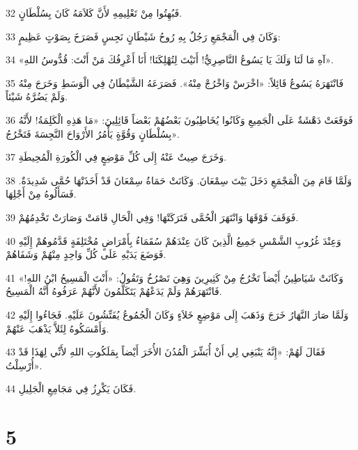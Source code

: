 \par 32 فَبُهِتُوا مِنْ تَعْلِيمِهِ لأَنَّ كَلاَمَهُ كَانَ بِسُلْطَانٍ.
\par 33 وَكَانَ فِي الْمَجْمَعِ رَجُلٌ بِهِ رُوحُ شَيْطَانٍ نَجِسٍ فَصَرَخَ بِصَوْتٍ عَظِيمٍ:
\par 34 «آهِ مَا لَنَا وَلَكَ يَا يَسُوعُ النَّاصِرِيُّ! أَتَيْتَ لِتُهْلِكَنَا! أَنَا أَعْرِفُكَ مَنْ أَنْتَ: قُدُّوسُ اللهِ».
\par 35 فَانْتَهَرَهُ يَسُوعُ قَائِلاً: «اخْرَسْ وَاخْرُجْ مِنْهُ». فَصَرَعَهُ الشَّيْطَانُ فِي الْوَسَطِ وَخَرَجَ مِنْهُ وَلَمْ يَضُرَّهُ شَيْئاً.
\par 36 فَوَقَعَتْ دَهْشَةٌ عَلَى الْجَمِيعِ وَكَانُوا يُخَاطِبُونَ بَعْضُهُمْ بَعْضاً قَائِلِينَ: «مَا هَذِهِ الْكَلِمَةُ! لأَنَّهُ بِسُلْطَانٍ وَقُوَّةٍ يَأْمُرُ الأَرْوَاحَ النَّجِسَةَ فَتَخْرُجُ».
\par 37 وَخَرَجَ صِيتٌ عَنْهُ إِلَى كُلِّ مَوْضِعٍ فِي الْكُورَةِ الْمُحِيطَةِ.
\par 38 وَلَمَّا قَامَ مِنَ الْمَجْمَعِ دَخَلَ بَيْتَ سِمْعَانَ. وَكَانَتْ حَمَاةُ سِمْعَانَ قَدْ أَخَذَتْهَا حُمَّى شَدِيدَةٌ. فَسَأَلُوهُ مِنْ أَجْلِهَا.
\par 39 فَوَقَفَ فَوْقَهَا وَانْتَهَرَ الْحُمَّى فَتَرَكَتْهَا! وَفِي الْحَالِ قَامَتْ وَصَارَتْ تَخْدِمُهُمْ.
\par 40 وَعِنْدَ غُرُوبِ الشَّمْسِ جَمِيعُ الَّذِينَ كَانَ عِنْدَهُمْ سُقَمَاءُ بِأَمْرَاضٍ مُخْتَلِفَةٍ قَدَّمُوهُمْ إِلَيْهِ فَوَضَعَ يَدَيْهِ عَلَى كُلِّ وَاحِدٍ مِنْهُمْ وَشَفَاهُمْ.
\par 41 وَكَانَتْ شَيَاطِينُ أَيْضاً تَخْرُجُ مِنْ كَثِيرِينَ وَهِيَ تَصْرُخُ وَتَقُولُ: «أَنْتَ الْمَسِيحُ ابْنُ اللهِ!» فَانْتَهَرَهُمْ وَلَمْ يَدَعْهُمْ يَتَكَلَّمُونَ لأَنَّهُمْ عَرَفُوهُ أَنَّهُ الْمَسِيحُ.
\par 42 وَلَمَّا صَارَ النَّهَارُ خَرَجَ وَذَهَبَ إِلَى مَوْضِعٍ خَلاَءٍ وَكَانَ الْجُمُوعُ يُفَتِّشُونَ عَلَيْهِ. فَجَاءُوا إِلَيْهِ وَأَمْسَكُوهُ لِئَلاَّ يَذْهَبَ عَنْهُمْ.
\par 43 فَقَالَ لَهُمْ: «إِنَّهُ يَنْبَغِي لِي أَنْ أُبَشِّرَ الْمُدُنَ الأُخَرَ أَيْضاً بِمَلَكُوتِ اللهِ لأَنِّي لِهَذَا قَدْ أُرْسِلْتُ».
\par 44 فَكَانَ يَكْرِزُ فِي مَجَامِعِ الْجَلِيلِ.

\chapter{5}

